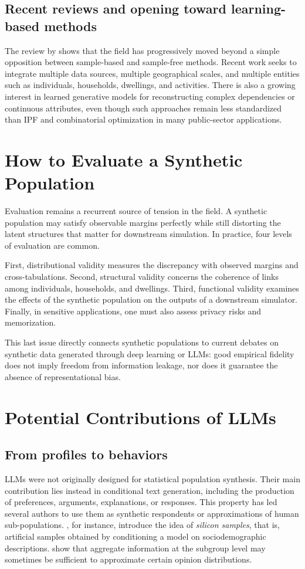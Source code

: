 \documentclass[11pt,a4paper]{article}
\begin{document}
\subsection{Recent reviews and opening toward learning-based methods}
The review by \citet{chapuis2022} shows that the field has progressively moved beyond a simple opposition between sample-based and sample-free methods. Recent work seeks to integrate multiple data sources, multiple geographical scales, and multiple entities such as individuals, households, dwellings, and activities. There is also a growing interest in learned generative models for reconstructing complex dependencies or continuous attributes, even though such approaches remain less standardized than IPF and combinatorial optimization in many public-sector applications.

\section{How to Evaluate a Synthetic Population}
Evaluation remains a recurrent source of tension in the field. A synthetic population may satisfy observable margins perfectly while still distorting the latent structures that matter for downstream simulation. In practice, four levels of evaluation are common.

First, distributional validity measures the discrepancy with observed margins and cross-tabulations. Second, structural validity concerns the coherence of links among individuals, households, and dwellings. Third, functional validity examines the effects of the synthetic population on the outputs of a downstream simulator. Finally, in sensitive applications, one must also assess privacy risks and memorization.

This last issue directly connects synthetic populations to current debates on synthetic data generated through deep learning or LLMs: good empirical fidelity does not imply freedom from information leakage, nor does it guarantee the absence of representational bias.

\section{Potential Contributions of LLMs}
\subsection{From profiles to behaviors}
LLMs were not originally designed for statistical population synthesis. Their main contribution lies instead in conditional text generation, including the production of preferences, arguments, explanations, or responses. This property has led several authors to use them as synthetic respondents or approximations of human sub-populations. \citet{argyle2023}, for instance, introduce the idea of \emph{silicon samples}, that is, artificial samples obtained by conditioning a model on sociodemographic descriptions. \citet{sun2024} show that aggregate information at the subgroup level may sometimes be sufficient to approximate certain opinion distributions.
\end{document}
